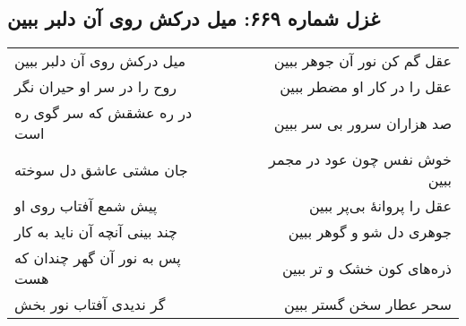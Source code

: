 \begin{center}
\section*{غزل شماره ۶۶۹: میل درکش روی آن دلبر ببین}
\label{sec:669}
\begin{longtable}{l p{0.5cm} r}
میل درکش روی آن دلبر ببین
&&
عقل گم کن نور آن جوهر ببین
\\
روح را در سر او حیران نگر
&&
عقل را در کار او مضطر ببین
\\
در ره عشقش که سر گوی ره است
&&
صد هزاران سرور بی سر ببین
\\
جان مشتی عاشق دل سوخته
&&
خوش نفس چون عود در مجمر ببین
\\
پیش شمع آفتاب روی او
&&
عقل را پروانهٔ بی‌پر ببین
\\
چند بینی آنچه آن ناید به کار
&&
جوهری دل شو و گوهر ببین
\\
پس به نور آن گهر چندان که هست
&&
ذره‌های کون خشک و تر ببین
\\
گر ندیدی آفتاب نور بخش
&&
سحر عطار سخن گستر ببین
\\
\end{longtable}
\end{center}

